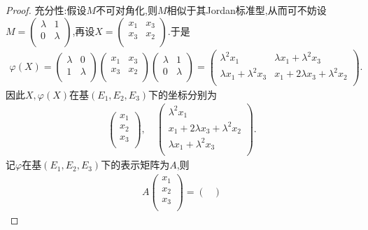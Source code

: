 \documentclass[../../main.tex]{subfiles}
\begin{document}
\begin{proof}
{\heiti 充分性:}假设$M$不可对角化,则$M$相似于其Jordan标准型,从而可不妨设$M=\begin{pmatrix}
\lambda&		1\\
0&		\lambda\\
\end{pmatrix}$,再设$X=\begin{pmatrix}
x_1&		x_3\\
x_3&		x_2\\
\end{pmatrix}$.于是
\begin{align*}
\varphi(X)=\begin{pmatrix}
\lambda&		0\\
1&		\lambda\\
\end{pmatrix}\begin{pmatrix}
x_1&		x_3\\
x_3&		x_2\\
\end{pmatrix}\begin{pmatrix}
\lambda&		1\\
0&		\lambda\\
\end{pmatrix}=\begin{pmatrix}
\lambda^2x_1&		\lambda x_1+\lambda^2x_3\\
\lambda x_1+\lambda^2x_3&		x_1+2\lambda x_3+\lambda^2x_2\\
\end{pmatrix}.
\end{align*}
因此$X,\varphi(X)$在基$(E_1,E_2,E_3)$下的坐标分别为
\begin{align*}
\begin{pmatrix}
x_1\\
x_2\\
x_3\\
\end{pmatrix},\quad\begin{pmatrix}
\lambda^2x_1\\
x_1+2\lambda x_3+\lambda^2x_2\\
\lambda x_1+\lambda^2x_3\\
\end{pmatrix}.
\end{align*}
记$\varphi$在基$(E_1,E_2,E_3)$下的表示矩阵为$A$,则
\begin{align*}
A\begin{pmatrix}
x_1\\
x_2\\
x_3\\
\end{pmatrix}=\begin{pmatrix}

\end{pmatrix}
\end{align*}
\end{proof}
\end{document}
